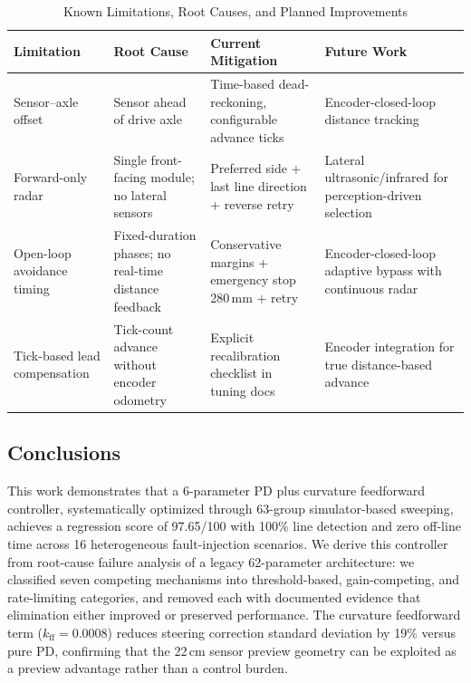 \documentclass[letterpaper,journal]{IEEEtran}
\begin{document}
\begin{table}[!t]
    \caption{Known Limitations, Root Causes, and Planned Improvements}
    \label{tab:limitations}
    \centering
    \footnotesize
    \begin{tabular}{@{}p{}p{}p{}p{}@{}}
        \toprule
        \textbf{Limitation} & \textbf{Root Cause} & \textbf{Current Mitigation} & \textbf{Future Work} \\
        \midrule
        Sensor--axle offset &
        Sensor ahead of drive axle &
        Time-based dead-reckoning, configurable advance ticks &
        Encoder-closed-loop distance tracking \\
        \addlinespace
        Forward-only radar &
        Single front-facing module; no lateral sensors &
        Preferred side + last line direction + reverse retry &
        Lateral ultrasonic/infrared for perception-driven selection \\
        \addlinespace
        Open-loop avoidance timing &
        Fixed-duration phases; no real-time distance feedback &
        Conservative margins + emergency stop 280\,mm + retry &
        Encoder-closed-loop adaptive bypass with continuous radar \\
        \addlinespace
        Tick-based lead compensation &
        Tick-count advance without encoder odometry &
        Explicit recalibration checklist in tuning docs &
        Encoder integration for true distance-based advance \\
        \bottomrule
    \end{tabular}
\end{table}

\subsection{Conclusions}

This work demonstrates that a 6-parameter PD plus curvature feedforward controller, systematically optimized through 63-group simulator-based sweeping, achieves a regression score of 97.65/100 with 100\% line detection and zero off-line time across 16 heterogeneous fault-injection scenarios. We derive this controller from root-cause failure analysis of a legacy 62-parameter architecture: we classified seven competing mechanisms into threshold-based, gain-competing, and rate-limiting categories, and removed each with documented evidence that elimination either improved or preserved performance. The curvature feedforward term ($k_{\text{ff}}=0.0008$) reduces steering correction standard deviation by 19\% versus pure PD, confirming that the 22\,cm sensor preview geometry can be exploited as a preview advantage rather than a control burden.
\end{document}
